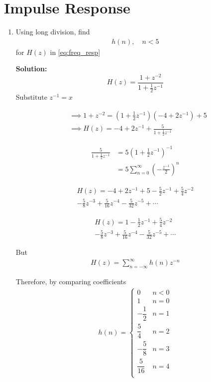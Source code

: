 \documentclass[journal,12pt,twocolumn]{IEEEtran}
\newcommand{\solution}{\noindent \textbf{Solution: }}
\providecommand{\brak}[1]{\ensuremath{\left(#1\right)}}
\numberwithin{equation}{section}
\renewcommand\thesection{\arabic{section}}
\begin{document}
	\section{Impulse Response}
	\begin{enumerate}[label=\thesection.\arabic*]
	\item Using long division, find
	\begin{align}
		h(n), \quad n < 5
	\end{align}
	for $H(z)$ in \eqref{eq:freq_resp}
	
	\solution 
	\begin{equation}
		H(z) = \frac{1 + z^{-2}}{1 + \frac12 z^{-1}}
	\end{equation}
	Substitute $z^{-1} = x$
	
	
	\begin{align}
		&\implies 1 + z^{-2} = \brak{1 + \frac12 z^{-1}}\brak{-4 + 2z^{-1}} + 5 \\
		&\implies H(z) = -4 + 2z^{-1} + \frac{5}{1 + \frac12 z^{-1}}
	\end{align}
	
	\begin{align}
		\frac{5}{1 + \frac12 z^{-1}} &= 5 \brak{1 + \frac12 z^{-1}}^{-1} \\
		&= 5 \sum_{n=0}^\infty \brak{-\frac{z^{-1}}{2}}^n
	\end{align}
	
	\begin{multline}
		H(z) = -4 + 2z^{-1} + 5 - \frac{5}{2}z^{-1} + \frac{5}{4}z^{-2}\\ - \frac{5}{8}z^{-3}  + \frac{5}{16}z^{-4} - \frac{5}{32}z^{-5} + \cdots
	\end{multline}
	
	\begin{multline}
		H(z) = 1  - \frac{1}{2}z^{-1} + \frac{5}{4}z^{-2}\\ - \frac{5}{8}z^{-3}  + \frac{5}{16}z^{-4} - \frac{5}{32}z^{-5} + \cdots
	\end{multline}
	
	But
	\begin{align}
		H(z) = \sum_{n=-\infty}^\infty h(n) z^{-n}
	\end{align}
	
	Therefore, by comparing coefficients
	\begin{align}
		h(n) = 
		\begin{cases}
			0 & n < 0 \\
			1 & n = 0 \\
			-\dfrac12 & n = 1 \\
			\dfrac{5}{4} & n = 2 \\
			-\dfrac{5}{8} & n = 3 \\
			\dfrac{5}{16} & n = 4 \\
		\end{cases}
	\end{align}
	

\end{enumerate}
\end{document}

